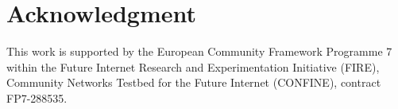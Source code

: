 \documentclass[conference]{IEEEtran}
\begin{document}
\section*{Acknowledgment}

This work is supported by the European Community Framework Programme 7
within the Future Internet Research and Experimentation Initiative
(FIRE), Community Networks Testbed for the Future Internet (CONFINE),
contract FP7-288535.








\end{document}
